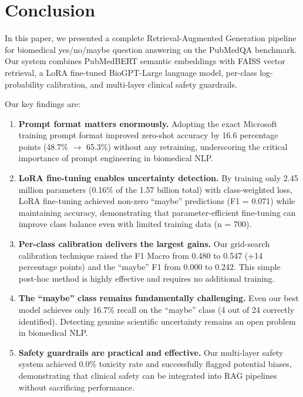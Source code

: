 \documentclass[conference]{IEEEtran}
\begin{document}
\section{Conclusion}

In this paper, we presented a complete Retrieval-Augmented Generation pipeline for biomedical yes/no/maybe question answering on the PubMedQA benchmark. Our system combines PubMedBERT semantic embeddings with FAISS vector retrieval, a LoRA fine-tuned BioGPT-Large language model, per-class log-probability calibration, and multi-layer clinical safety guardrails.

Our key findings are:

\begin{enumerate}[leftmargin=*]
    \item \textbf{Prompt format matters enormously.} Adopting the exact Microsoft training prompt format improved zero-shot accuracy by 16.6 percentage points (48.7\% $\rightarrow$ 65.3\%) without any retraining, underscoring the critical importance of prompt engineering in biomedical NLP.

    \item \textbf{LoRA fine-tuning enables uncertainty detection.} By training only 2.45 million parameters (0.16\% of the 1.57 billion total) with class-weighted loss, LoRA fine-tuning achieved non-zero ``maybe'' predictions (F1 = 0.071) while maintaining accuracy, demonstrating that parameter-efficient fine-tuning can improve class balance even with limited training data (n = 700).

    \item \textbf{Per-class calibration delivers the largest gains.} Our grid-search calibration technique raised the F1 Macro from 0.480 to 0.547 (+14 percentage points) and the ``maybe'' F1 from 0.000 to 0.242. This simple post-hoc method is highly effective and requires no additional training.

    \item \textbf{The ``maybe'' class remains fundamentally challenging.} Even our best model achieves only 16.7\% recall on the ``maybe'' class (4 out of 24 correctly identified). Detecting genuine scientific uncertainty remains an open problem in biomedical NLP.

    \item \textbf{Safety guardrails are practical and effective.} Our multi-layer safety system achieved 0.0\% toxicity rate and successfully flagged potential biases, demonstrating that clinical safety can be integrated into RAG pipelines without sacrificing performance.
\end{enumerate}
\end{document}
